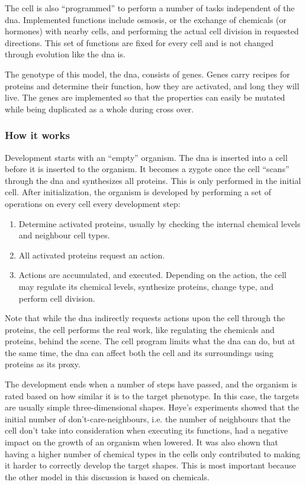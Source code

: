 The cell is also ``programmed'' to perform a number of tasks independent of the dna. Implemented functions include osmosis, or the exchange of chemicals (or hormones) with nearby cells, and performing the actual cell division in requested directions. This set of functions are fixed for every cell and is not changed through evolution like the dna is.

The genotype of this model, the dna, consists of genes. Genes carry recipes for proteins and determine their function, how they are activated, and long they will live. The genes are implemented so that the properties can easily be mutated while being duplicated as a whole during cross over.

\subsubsection{How it works}
Development starts with an ``empty'' organism. The dna is inserted into a cell before it is inserted to the organism. It becomes a zygote once the cell ``scans'' through the dna and synthesizes all proteins. This is only performed in the initial cell. After initialization, the organism is developed by performing a set of operations on every cell every development step:

\begin{enumerate}
	\itemsep=0pt
	\item Determine activated proteins, usually by checking the internal chemical levels and neighbour cell types.
	\item All activated proteins request an action.
	\item Actions are accumulated, and executed. Depending on the action, the cell may regulate its chemical levels, synthesize proteins, change type, and perform cell division.
\end{enumerate}

Note that while the dna indirectly requests actions upon the cell through the proteins, the cell performs the real work, like regulating the chemicals and proteins, behind the scene. The cell program limits what the dna can do, but at the same time, the dna can affect both the cell and its surroundings using proteins as its proxy.

The development ends when a number of steps have passed, and the organism is rated based on how similar it is to the target phenotype. In this case, the targets are usually simple three-dimensional shapes. H{\o}ye's experiments showed that the initial number of don't-care-neighbours, i.e. the number of neighbours that the cell don't take into consideration when executing its functions, had a negative impact on the growth of an organism when lowered. It was also shown that having a higher number of chemical types in the cells only contributed to making it harder to correctly develop the target shapes. This is most important because the other model in this discussion is based on chemicals.


